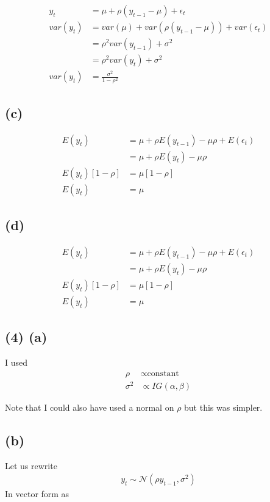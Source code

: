 \documentclass[11pt]{article}
\begin{document}
\begin{align*}
    y_t &= \mu + \rho(y_{t-1} -\mu) + \epsilon_t \\
     var(y_t) &= var(\mu) + var(\rho(y_{t-1} -\mu)) + var(\epsilon_t) \\
     &= \rho^2var(y_{t-1}) + \sigma^2\\
      &= \rho^2var(y_{t}) + \sigma^2\\
      var(y_t) &= \frac{\sigma^2}{1-\rho^2}
\end{align*}

\subsection*{(c)}
\begin{align*}
    E(y_t) &= \mu + \rho E(y_{t-1}) - \mu\rho + E(\epsilon_t)\\
    &= \mu + \rho E(y_{t}) - \mu\rho\\
    E(y_t)[1-\rho] &= \mu[1-\rho]\\
    E(y_t) &= \mu
\end{align*}

\subsection*{(d)}
\begin{align*}
    E(y_t) &= \mu + \rho E(y_{t-1}) - \mu\rho + E(\epsilon_t)\\
    &= \mu + \rho E(y_{t}) - \mu\rho\\
    E(y_t)[1-\rho] &= \mu[1-\rho]\\
    E(y_t) &= \mu
\end{align*}

\subsection*{(4) (a)}
I used 
\begin{align*}
    \rho & \propto \text{constant}\\
    \sigma^2 & \propto IG(\alpha, \beta)
\end{align*}

Note that I could also have used a normal on $\rho$ but this was simpler.

\subsection*{(b)}
Let us rewrite 
\begin{align*}
    y_t \sim \mathcal{N}(\rho y_{t-1}, \sigma^2)
\end{align*}
In vector form as
\end{document}
